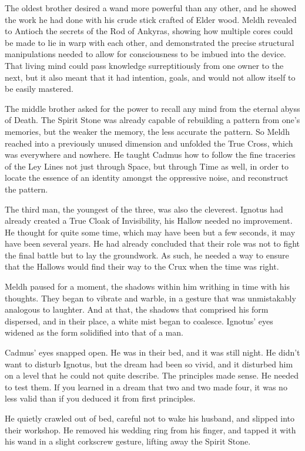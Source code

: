 The oldest brother desired a wand more powerful than any other, and he showed the work he had done with his crude stick crafted of Elder wood. Meldh revealed to Antioch the secrets of the Rod of Ankyras, showing how multiple cores could be made to lie in warp with each other, and demonstrated the precise structural manipulations needed to allow for consciousness to be imbued into the device. That living mind could pass knowledge surreptitiously from one owner to the next, but it also meant that it had intention, goals, and would not allow itself to be easily mastered.

The middle brother asked for the power to recall any mind from the eternal abyss of Death. The Spirit Stone was already capable of rebuilding a pattern from one’s memories, but the weaker the memory, the less accurate the pattern. So Meldh reached into a previously unused dimension and unfolded the True Cross, which was everywhere and nowhere. He taught Cadmus how to follow the fine traceries of the Ley Lines not just through Space, but through Time as well, in order to locate the essence of an identity amongst the oppressive noise, and reconstruct the pattern.

The third man, the youngest of the three, was also the cleverest. Ignotus had already created a True Cloak of Invisibility, his Hallow needed no improvement. He thought for quite some time, which may have been but a few seconds, it may have been several years. He had already concluded that their role was not to fight the final battle but to lay the groundwork. As such, he needed a way to ensure that the Hallows would find their way to the Crux when the time was right.

Meldh paused for a moment, the shadows within him writhing in time with his thoughts. They began to vibrate and warble, in a gesture that was unmistakably analogous to laughter. And at that, the shadows that comprised his form dispersed, and in their place, a white mist began to coalesce. Ignotus’ eyes widened as the form solidified into that of a man.
\simpleline

Cadmus’ eyes snapped open. He was in their bed, and it was still night. He didn’t want to disturb Ignotus, but the dream had been so vivid, and it disturbed him on a level that he could not quite describe. The principles made sense. He needed to test them. If you learned in a dream that two and two made four, it was no less valid than if you deduced it from first principles.

He quietly crawled out of bed, careful not to wake his husband, and slipped into their workshop. He removed his wedding ring from his finger, and tapped it with his wand in a slight corkscrew gesture, lifting away the Spirit Stone.

